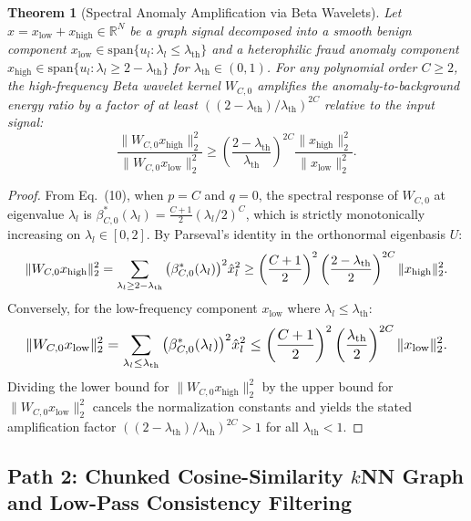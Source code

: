 \documentclass[10pt,a4paper,twocolumn]{article}
\newtheorem{theorem}{Theorem}
\begin{document}
\begin{theorem}[Spectral Anomaly Amplification via Beta Wavelets]
Let $x = x_{\text{low}} + x_{\text{high}} \in \mathbb{R}^N$ be a graph signal decomposed into a smooth benign component $x_{\text{low}} \in \text{span}\{u_l : \lambda_l \le \lambda_{\text{th}}\}$ and a heterophilic fraud anomaly component $x_{\text{high}} \in \text{span}\{u_l : \lambda_l \ge 2 - \lambda_{\text{th}}\}$ for $\lambda_{\text{th}} \in (0, 1)$. For any polynomial order $C \ge 2$, the high-frequency Beta wavelet kernel $W_{C,0}$ amplifies the anomaly-to-background energy ratio by a factor of at least $((2 - \lambda_{\text{th}})/\lambda_{\text{th}})^{2C}$ relative to the input signal:
\begin{equation}
  \frac{\|W_{C,0} x_{\text{high}}\|_2^2}{\|W_{C,0} x_{\text{low}}\|_2^2} \ge \left(\frac{2 - \lambda_{\text{th}}}{\lambda_{\text{th}}}\right)^{2C} \frac{\|x_{\text{high}}\|_2^2}{\|x_{\text{low}}\|_2^2}.
\end{equation}
\end{theorem}

\begin{proof}
From Eq.\ (10), when $p = C$ and $q = 0$, the spectral response of $W_{C,0}$ at eigenvalue $\lambda_l$ is $\beta_{C,0}^*(\lambda_l) = \frac{C+1}{2}(\lambda_l/2)^C$, which is strictly monotonically increasing on $\lambda_l \in [0, 2]$. By Parseval's identity in the orthonormal eigenbasis $U$:
\[
  \resizebox{0.96\linewidth}{!}{$\displaystyle \|W_{C,0} x_{\text{high}}\|_2^2 = \sum_{\lambda_l \ge 2 - \lambda_{\text{th}}} \big(\beta_{C,0}^*(\lambda_l)\big)^2 \hat{x}_l^2 \ge \left(\frac{C+1}{2}\right)^2 \left(\frac{2 - \lambda_{\text{th}}}{2}\right)^{2C} \|x_{\text{high}}\|_2^2.$}
\]
Conversely, for the low-frequency component $x_{\text{low}}$ where $\lambda_l \le \lambda_{\text{th}}$:
\[
  \resizebox{0.96\linewidth}{!}{$\displaystyle \|W_{C,0} x_{\text{low}}\|_2^2 = \sum_{\lambda_l \le \lambda_{\text{th}}} \big(\beta_{C,0}^*(\lambda_l)\big)^2 \hat{x}_l^2 \le \left(\frac{C+1}{2}\right)^2 \left(\frac{\lambda_{\text{th}}}{2}\right)^{2C} \|x_{\text{low}}\|_2^2.$}
\]
Dividing the lower bound for $\|W_{C,0} x_{\text{high}}\|_2^2$ by the upper bound for $\|W_{C,0} x_{\text{low}}\|_2^2$ cancels the normalization constants and yields the stated amplification factor $((2 - \lambda_{\text{th}})/\lambda_{\text{th}})^{2C} > 1$ for all $\lambda_{\text{th}} < 1$.
\end{proof}

\subsection{Path 2: Chunked Cosine-Similarity \texorpdfstring{$k$NN}{kNN} Graph and Low-Pass Consistency Filtering}
\end{document}
